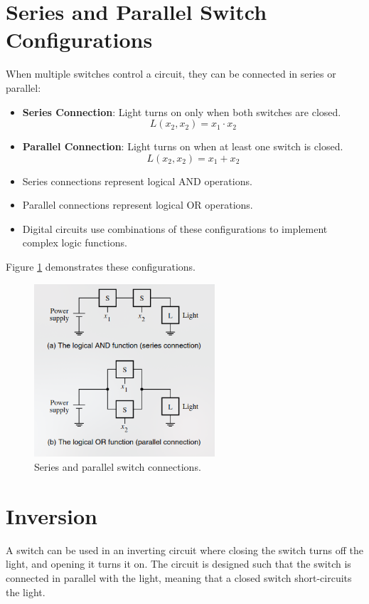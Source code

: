 \documentclass{article}
\begin{document}
\section{Series and Parallel Switch Configurations}
When multiple switches control a circuit, they can be connected in series or parallel:
\begin{itemize}
\item \textbf{Series Connection}: Light turns on only when both switches are closed.
\begin{equation}
L(x_2, x_2) = x_1 \cdot x_2
\end{equation}
\item \textbf{Parallel Connection}: Light turns on when at least one switch is closed.
\begin{equation}
L(x_2, x_2) = x_1 + x_2
\end{equation}
\item Series connections represent logical AND operations.
\item Parallel connections represent logical OR operations.
\item Digital circuits use combinations of these configurations to implement complex logic functions.
\end{itemize}
Figure \ref{fig:series_parallel} demonstrates these configurations.

\begin{figure}[h]
\centering
\includegraphics[width=0.6\textwidth]{series_parallel.png} %
\caption{Series and parallel switch connections.}
\label{fig:series_parallel}
\end{figure}

\section{Inversion}
A switch can be used in an inverting circuit where closing the switch turns off the light, and opening it turns it on. The circuit is designed such that the switch is connected in parallel with the light, meaning that a closed switch short-circuits the light.
\end{document}
